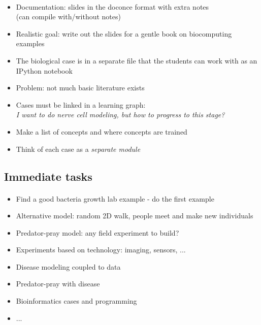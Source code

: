 \documentclass[%
twoside,                 %
final,                   %
10pt]{article}
\begin{document}
\paragraph{}
\begin{itemize}
 \item Documentation: slides in the doconce format with extra notes\\
   (can compile with/without notes)

 \item Realistic goal: write out the slides for a gentle book on biocomputing examples

 \item The biological case is in a separate file that the students can work
   with as an IPython notebook

 \item Problem: not much basic literature exists

 \item Cases must be linked in a learning graph:\\
   \emph{I want to do nerve cell modeling, but how to progress to this stage?}

 \item Make a list of concepts and where concepts are trained

 \item Think of each case as a \emph{separate module}
\end{itemize}

\noindent



\subsection*{Immediate tasks}


\paragraph{}
\begin{itemize}
 \item Find a good bacteria growth lab example - do the first example

 \item Alternative model: random 2D walk, people meet and make new individuals

 \item Predator-pray model: any field experiment to build?

 \item Experiments based on technology: imaging, sensors, ...

 \item Disease modeling coupled to data

 \item Predator-pray with disease

 \item Bioinformatics cases and programming

 \item ...
\end{itemize}
\end{document}
